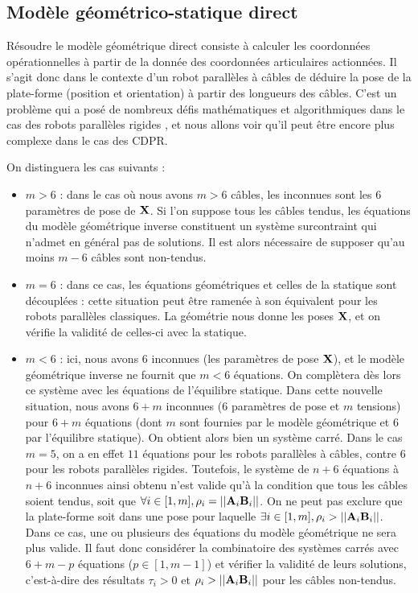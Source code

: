 \subsection{Modèle géométrico-statique direct}\label{chap0-1-4}

Résoudre le modèle géométrique direct consiste à calculer les coordonnées 
opéra\-tionnelles à partir de la donnée des coordonnées articulaires 
actionn\'ees. Il s'agit donc dans le contexte d'un robot parallèles à câbles de 
déduire la pose de la plate-forme (position et orientation) à partir des 
longueurs des câbles. C'est un problème qui a posé de nombreux défis 
mathématiques et algorithmiques dans le cas des robots parallèles rigides 
\cite{merlet1997robots}, et nous allons voir qu'il peut \^etre encore plus 
complexe dans le cas des CDPR.

On distinguera les cas suivants :
\begin{itemize}
  \item $m > 6$ : dans le cas o\`u nous avons $m > 6$ c\^ables, les inconnues 
sont les $6$ param\`etres de pose de $\bf X$. Si l'on suppose tous les c\^ables 
tendus, les \'equations du mod\`ele g\'eom\'etrique inverse constituent un 
syst\`eme surcontraint qui n'admet en g\'en\'eral pas de solutions. Il est 
alors n\'ecessaire de supposer qu'au moins $m-6$ c\^ables sont non-tendus.
  \item $m = 6$ : dans ce cas, les \'equations g\'eom\'etriques et celles de la 
statique sont d\'ecoupl\'ees : cette situation peut \^etre ramen\'ee \`a son 
\'equivalent pour les robots parall\`eles classiques. La g\'eom\'etrie 
nous donne les poses $\bf X$, et on v\'erifie la validit\'e de celles-ci avec 
la statique.
  \item $m < 6$ : ici, nous avons $6$ inconnues (les param\`etres de 
pose $\bf X$), et le mod\`ele g\'eom\'etrique inverse ne fournit que $m < 6$ 
\'equations. On compl\`etera d\`es lors ce syst\`eme avec les \'equations de 
l'\'equilibre statique. Dans cette nouvelle situation, nous avons $6 + m$ 
inconnues ($6$ param\`etres de pose et $m$ tensions) pour $6 + m$ \'equations 
(dont $m$ sont fournies par le mod\`ele g\'eom\'etrique et $6$ par l'\'equilibre 
statique). On obtient alors bien un syst\`eme carr\'e. Dans le cas 
$m = 5$, on a en effet $11$ \'equations pour les robots parall\`eles \`a 
c\^ables, contre $6$ pour les robots parall\`eles rigides. Toutefois, le 
syst\`eme de $n+6$ \'equations \`a $n+6$ inconnues ainsi obtenu n'est valide 
qu'\`a la condition que tous les c\^ables soient tendus, soit que $\forall i 
\in [1,m], \rho_i = ||{\bf A}_i{\bf B}_i||$. On ne peut pas exclure que la 
plate-forme soit dans une pose pour la\-quelle $\exists i \in [1,m], \rho_i > 
||{\bf A}_i{\bf B}_i||$. Dans ce cas, une ou plusieurs des \'equations du 
mod\`ele g\'eom\'etrique ne sera plus valide. Il faut donc consid\'erer la 
combinatoire des syst\`emes carr\'es avec $6+m-p$ \'equations ($p \in [1, 
m-1]$) et v\'erifier la validit\'e de leurs solutions, c'est-\`a-dire des 
r\'esultats $\tau_i > 0$ et $\rho_i > ||{\bf A}_i{\bf B}_i||$ pour les 
c\^ables non-tendus. 
\end{itemize}

